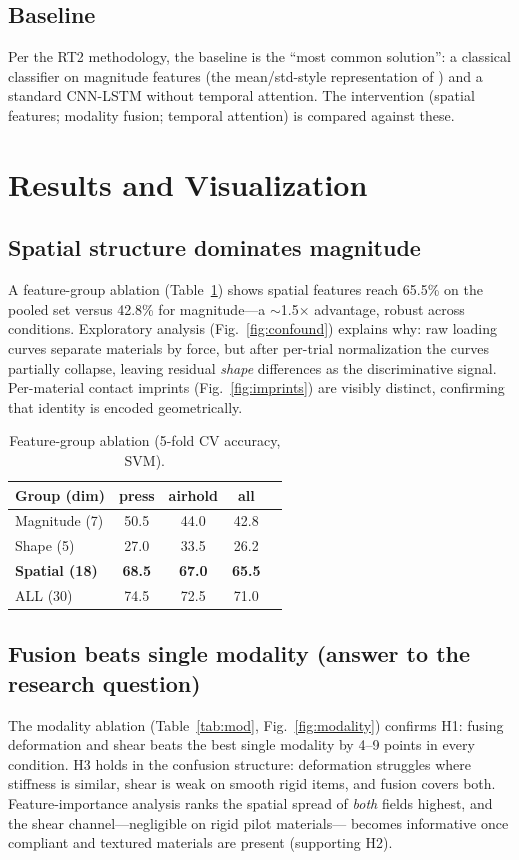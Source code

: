 \documentclass[conference]{IEEEtran}
\begin{document}
\subsection{Baseline}
Per the RT2 methodology, the baseline is the ``most common solution'': a
classical classifier on magnitude features (the mean/std-style representation of
\cite{amin2023}) and a standard CNN-LSTM without temporal attention. The
intervention (spatial features; modality fusion; temporal attention) is compared
against these.

\section{Results and Visualization}
\subsection{Spatial structure dominates magnitude}
A feature-group ablation (Table~\ref{tab:feat}) shows spatial features reach
65.5\% on the pooled set versus 42.8\% for magnitude---a $\sim$1.5$\times$
advantage, robust across conditions. Exploratory analysis
(Fig.~\ref{fig:confound}) explains why: raw loading curves separate materials by
force, but after per-trial normalization the curves partially collapse, leaving
residual \emph{shape} differences as the discriminative signal. Per-material
contact imprints (Fig.~\ref{fig:imprints}) are visibly distinct, confirming that
identity is encoded geometrically.

\begin{table}[t]
\caption{Feature-group ablation (5-fold CV accuracy, SVM).}
\label{tab:feat}
\centering
\begin{tabular}{lcccc}
\toprule
Group (dim) & press & airhold & all \\
\midrule
Magnitude (7) & 50.5 & 44.0 & 42.8 \\
Shape (5) & 27.0 & 33.5 & 26.2 \\
\textbf{Spatial (18)} & \textbf{68.5} & \textbf{67.0} & \textbf{65.5} \\
ALL (30) & 74.5 & 72.5 & 71.0 \\
\bottomrule
\end{tabular}
\end{table}

\subsection{Fusion beats single modality (answer to the research question)}
The modality ablation (Table~\ref{tab:mod}, Fig.~\ref{fig:modality}) confirms
H1: fusing deformation and shear beats the best single modality by 4--9 points
in every condition. H3 holds in the confusion structure: deformation struggles
where stiffness is similar, shear is weak on smooth rigid items, and fusion
covers both. Feature-importance analysis ranks the spatial spread of \emph{both}
fields highest, and the shear channel---negligible on rigid pilot materials---
becomes informative once compliant and textured materials are present
(supporting H2).
\end{document}

